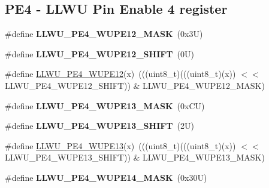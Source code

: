 \subsection*{P\+E4 -\/ L\+L\+WU Pin Enable 4 register}
\begin{DoxyCompactItemize}
\item 
\mbox{\label{group___l_l_w_u___register___masks_ga0d1b6351b58cc9fbf3099dc653754205}} 
\#define {\bfseries L\+L\+W\+U\+\_\+\+P\+E4\+\_\+\+W\+U\+P\+E12\+\_\+\+M\+A\+SK}~(0x3\+U)
\item 
\mbox{\label{group___l_l_w_u___register___masks_gaddb0a17347a85705dc2c2975129a7942}} 
\#define {\bfseries L\+L\+W\+U\+\_\+\+P\+E4\+\_\+\+W\+U\+P\+E12\+\_\+\+S\+H\+I\+FT}~(0\+U)
\item 
\#define \mbox{\hyperlink{group___l_l_w_u___register___masks_ga433532e85a0db075b0e525c1483a27ad}{L\+L\+W\+U\+\_\+\+P\+E4\+\_\+\+W\+U\+P\+E12}}(x)~(((uint8\+\_\+t)(((uint8\+\_\+t)(x)) $<$$<$ L\+L\+W\+U\+\_\+\+P\+E4\+\_\+\+W\+U\+P\+E12\+\_\+\+S\+H\+I\+FT)) \& L\+L\+W\+U\+\_\+\+P\+E4\+\_\+\+W\+U\+P\+E12\+\_\+\+M\+A\+SK)
\item 
\mbox{\label{group___l_l_w_u___register___masks_ga4d9218c37bd27ed586a5e73aa1b20a84}} 
\#define {\bfseries L\+L\+W\+U\+\_\+\+P\+E4\+\_\+\+W\+U\+P\+E13\+\_\+\+M\+A\+SK}~(0x\+C\+U)
\item 
\mbox{\label{group___l_l_w_u___register___masks_ga176680468b0cf75fbccc4a8be5d45388}} 
\#define {\bfseries L\+L\+W\+U\+\_\+\+P\+E4\+\_\+\+W\+U\+P\+E13\+\_\+\+S\+H\+I\+FT}~(2\+U)
\item 
\#define \mbox{\hyperlink{group___l_l_w_u___register___masks_ga0f97d1fbb1fd4c3be4a4641755e8b7a9}{L\+L\+W\+U\+\_\+\+P\+E4\+\_\+\+W\+U\+P\+E13}}(x)~(((uint8\+\_\+t)(((uint8\+\_\+t)(x)) $<$$<$ L\+L\+W\+U\+\_\+\+P\+E4\+\_\+\+W\+U\+P\+E13\+\_\+\+S\+H\+I\+FT)) \& L\+L\+W\+U\+\_\+\+P\+E4\+\_\+\+W\+U\+P\+E13\+\_\+\+M\+A\+SK)
\item 
\mbox{\label{group___l_l_w_u___register___masks_gae3a1e7b7497f719cfebd559f31dc4d07}} 
\#define {\bfseries L\+L\+W\+U\+\_\+\+P\+E4\+\_\+\+W\+U\+P\+E14\+\_\+\+M\+A\+SK}~(0x30\+U)
\item 
\mbox{\label{group___l_l_w_u___register___masks_ga1942d07f99eb5afb836650dcfb2185af}} 

\end{DoxyCompactItemize}
